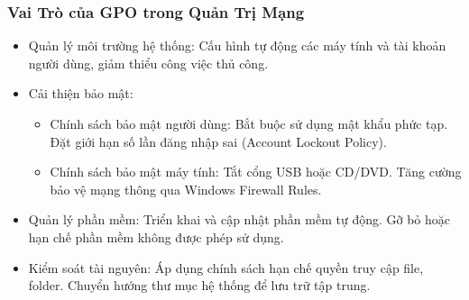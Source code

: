 \documentclass[13pt]{article}
\begin{document}
                \subsubsection{Vai Trò của GPO trong Quản Trị Mạng}
                \begin{itemize}
                \item Quản lý môi trường hệ thống: Cấu hình tự động các máy tính và tài khoản người dùng, giảm thiểu công việc thủ công.

                \item Cải thiện bảo mật:
                    \begin{itemize}
                        \item Chính sách bảo mật người dùng: Bắt buộc sử dụng mật khẩu phức tạp. Đặt giới hạn số lần đăng nhập sai (Account Lockout Policy).

                        \item Chính sách bảo mật máy tính: Tắt cổng USB hoặc CD/DVD. Tăng cường bảo vệ mạng thông qua Windows Firewall Rules.
                    \end{itemize}

                \item Quản lý phần mềm: Triển khai và cập nhật phần mềm tự động. Gỡ bỏ hoặc hạn chế phần mềm không được phép sử dụng.

                \item Kiểm soát tài nguyên: Áp dụng chính sách hạn chế quyền truy cập file, folder. Chuyển hướng thư mục hệ thống để lưu trữ tập trung.
                \end{itemize}
\end{document}
